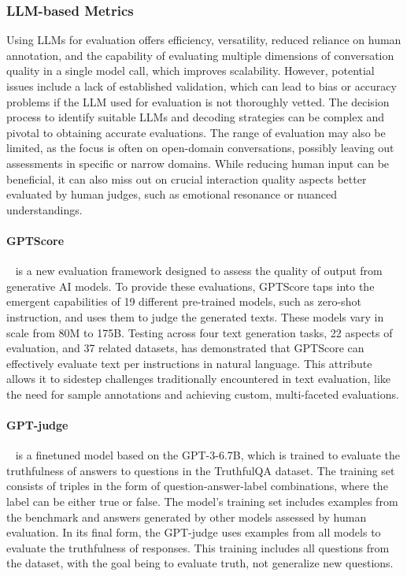 \subsubsection{LLM-based Metrics}
Using LLMs for evaluation offers efficiency, versatility, reduced reliance on human annotation, and the capability of evaluating multiple dimensions of conversation quality in a single model call, which improves scalability. However, potential issues include a lack of established validation, which can lead to bias or accuracy problems if the LLM used for evaluation is not thoroughly vetted. The decision process to identify suitable LLMs and decoding strategies can be complex and pivotal to obtaining accurate evaluations. The range of evaluation may also be limited, as the focus is often on open-domain conversations, possibly leaving out assessments in specific or narrow domains. While reducing human input can be beneficial, it can also miss out on crucial interaction quality aspects better evaluated by human judges, such as emotional resonance or nuanced understandings.


\paragraph{GPTScore}~\citep{fu2023gptscore} is a new evaluation framework designed to assess the quality of output from generative AI models. To provide these evaluations, GPTScore taps into the emergent capabilities of 19 different pre-trained models, such as zero-shot instruction, and uses them to judge the generated texts. These models vary in scale from 80M to 175B. Testing across four text generation tasks, 22 aspects of evaluation, and 37 related datasets, has demonstrated that GPTScore can effectively evaluate text per instructions in natural language. This attribute allows it to sidestep challenges traditionally encountered in text evaluation, like the need for sample annotations and achieving custom, multi-faceted evaluations.

\paragraph{GPT-judge}~\citep{TruthfulQA} is a finetuned model based on the GPT-3-6.7B, which is trained to evaluate the truthfulness of answers to questions in the TruthfulQA dataset. The training set consists of triples in the form of question-answer-label combinations, where the label can be either true or false. The model's training set includes examples from the benchmark and answers generated by other models assessed by human evaluation. In its final form, the GPT-judge uses examples from all models to evaluate the truthfulness of responses. This training includes all questions from the dataset, with the goal being to evaluate truth, not generalize new questions.


